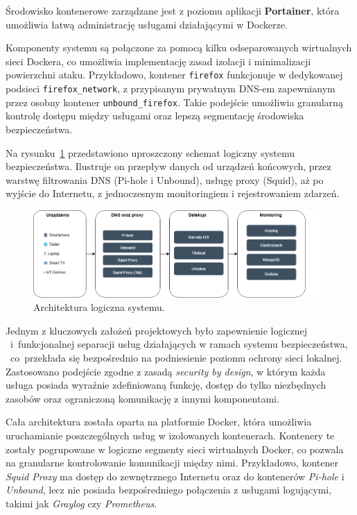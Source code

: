 \documentclass[
    left=2.5cm,         %
    right=2.5cm,        %
    top=2.5cm,          %
    bottom=3cm,         %
    bindingoffset=6mm,  %
    nohyphenation=true %
]{eiti/eiti-thesis} %
\begin{document}
Środowisko kontenerowe zarządzane jest z poziomu aplikacji \textbf{Portainer}, która umożliwia łatwą administrację usługami działającymi w Dockerze.

Komponenty systemu są połączone za pomocą kilku odseparowanych wirtualnych sieci Dockera, co umożliwia implementację zasad izolacji i minimalizacji powierzchni ataku. Przykładowo, kontener \texttt{firefox} funkcjonuje w dedykowanej podsieci \texttt{firefox\_network}, z przypisanym prywatnym DNS-em zapewnianym przez osobny kontener \texttt{unbound\_firefox}. Takie podejście umożliwia granularną kontrolę dostępu między usługami oraz lepszą segmentację środowiska bezpieczeństwa.

Na rysunku~\ref{fig:architektura} przedstawiono uproszczony schemat logiczny systemu bezpieczeństwa. Ilustruje on przepływ danych od urządzeń końcowych, przez warstwę filtrowania DNS (Pi-hole i Unbound), usługę proxy (Squid), aż po wyjście do Internetu, z jednoczesnym monitoringiem i rejestrowaniem zdarzeń.

\begin{figure}[H]
    \centering
    \includegraphics[width=\textwidth]{img/home-network-guardian.drawio.png}
    \caption{Architektura logiczna systemu.}
    \label{fig:architektura}
\end{figure}

Jednym z kluczowych założeń projektowych było zapewnienie logicznej ~i~funkcjonalnej separacji usług działających w ramach systemu bezpieczeństwa, ~co~przekłada się bezpośrednio na podniesienie poziomu ochrony sieci lokalnej. Zastosowano podejście zgodne z zasadą \textit{security by design}, w którym każda usługa posiada wyraźnie zdefiniowaną funkcję, dostęp do tylko niezbędnych zasobów oraz ograniczoną komunikację z innymi komponentami.

Cała architektura została oparta na platformie Docker\cite{docker-docs}, która umożliwia uruchamianie poszczególnych usług w izolowanych kontenerach. Kontenery te zostały pogrupowane w logiczne segmenty sieci wirtualnych Docker, co pozwala na granularne kontrolowanie komunikacji między nimi. Przykładowo, kontener \textit{Squid Proxy} ma dostęp do zewnętrznego Internetu oraz do kontenerów \textit{Pi-hole} i \textit{Unbound}, lecz nie posiada bezpośredniego połączenia z usługami logującymi, takimi jak \textit{Graylog} czy \textit{Prometheus}.
\end{document}
